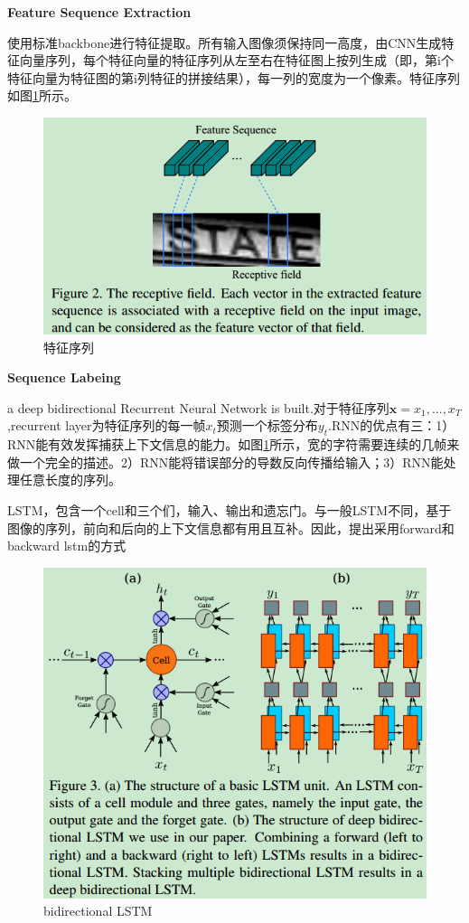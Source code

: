 \documentclass{article}
\begin{document}
\textbf{Feature Sequence Extraction}

使用标准backbone进行特征提取。所有输入图像须保持同一高度，由CNN生成特征向量序列，每个特征向量的特征序列从左至右在特征图上按列生成（即，第i个特征向量为特征图的第i列特征的拼接结果），每一列的宽度为一个像素。特征序列如图\ref{Fig.crnn_feature}所示。

\begin{figure}
\centering
\includegraphics[scale=0.5]{images/CRNN/CRNN_feature_extract.png}
\caption{特征序列}
\label{Fig.crnn_feature}
\end{figure}

\textbf{Sequence Labeing}

a deep bidirectional Recurrent Neural Network is built.对于特征序列$\textbf{x}=x_1,...,x_T$,recurrent layer为特征序列的每一帧$x_t$预测一个标签分布$y_t$.RNN的优点有三：1）RNN能有效发挥捕获上下文信息的能力。如图\ref{Fig.crnn_feature}所示，宽的字符需要连续的几帧来做一个完全的描述。2）RNN能将错误部分的导数反向传播给输入；3）RNN能处理任意长度的序列。

LSTM，包含一个cell和三个们，输入、输出和遗忘门。与一般LSTM不同，基于图像的序列，前向和后向的上下文信息都有用且互补。因此，提出采用forward和backward lstm的方式

\begin{figure}
\centering
\includegraphics[scale=0.5]{images/CRNN/lstm_unit.png}
\caption{bidirectional LSTM}
\label{Fig.bidirectional_lstm}
\end{figure}
\end{document}
